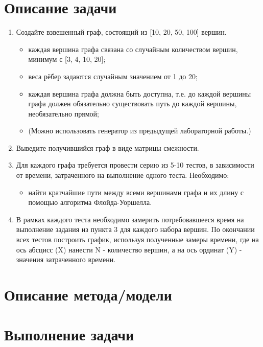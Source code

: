 \documentclass[12pt, a4paper]{report}
\begin{document}
	\section*{Описание задачи}
	\large
	\begin{enumerate}
		\item Создайте взвешенный граф, состоящий из [10, 20, 50, 100] вершин.
		\begin{itemize}
			\item каждая вершина графа связана со случайным количеством вершин, минимум с [3, 4, 10, 20];
			\item веса рёбер задаются случайным значением от 1 до 20;	
			\item каждая вершина графа должна быть доступна, т.е. до каждой вершины графа должен обязательно существовать путь до каждой вершины, необязательно прямой;
			\item (Можно использовать генератор из предыдущей лабораторной работы.)
		\end{itemize}
		\item Выведите получившийся граф в виде матрицы смежности.
		\item Для каждого графа требуется провести серию из 5-10 тестов, в зависимости от времени, затраченного на выполнение одного теста. Необходимо:
		\begin{itemize}
			\item найти кратчайшие пути между всеми вершинами графа и их длину с помощью алгоритма Флойда-Уоршелла.
		\end{itemize}
		\item В рамках каждого теста необходимо замерить потребовавшееся время на выполнение задания из пункта 3 для каждого набора вершин. По окончании всех тестов построить график, используя полученные замеры времени, где на ось абсцисс (X) нанести N - количество вершин, а на ось ординат (Y) - значения затраченного времени.
	\end{enumerate}

	\newpage

	\section*{Описание метода/модели}
	\large

	\newpage

	\section*{Выполнение задачи}
\end{document}

